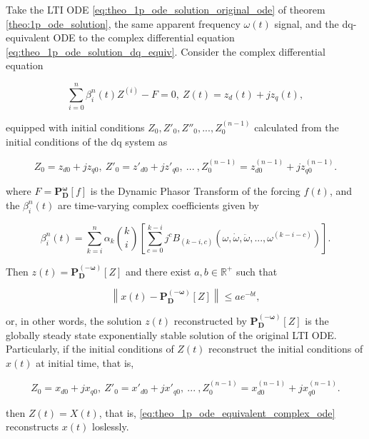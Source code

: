 \begin{theorem}\label{corollary:complex_equivalence_phasorialodes} %

	Take the LTI ODE \eqref{eq:theo_1p_ode_solution_original_ode} of theorem \ref{theo:1p_ode_solution}, the same apparent frequency $\omega(t)$ signal, and the dq-equivalent ODE to the complex differential equation \eqref{eq:theo_1p_ode_solution_dq_equiv}. Consider the complex differential equation

\begin{equation} \sum\limits_{i=0}^n \beta_i^n(t) Z^{(i)} - F = 0,\ Z(t) = z_d(t) + jz_q(t), \label{eq:theo_1p_ode_equivalent_complex_ode} \end{equation}

	\noindent equipped with	initial conditions $Z_0,Z'_0,Z''_0,...,Z^{(n-1)}_0$ calculated from the initial conditions of the dq system as

\begin{equation} Z_0 = z_{d0} + jz_{q0},\ Z'_0 = z'_{d0} + jz'_{q0},\ ...\ ,Z^{(n-1)}_0 = z^{(n-1)}_{d0} + jz^{(n-1)}_{q0}. \end{equation}
	
	\noindent where $F = \mathbf{P_D^\omega}\left[f\right]$ is the Dynamic Phasor Transform of the forcing $f(t)$, and the $\beta_i^n(t)$ are time-varying complex coefficients given by

\begin{equation} \beta_i^n(t) = \sum\limits_{k=i}^{n} \alpha_k{k\choose i} \left[\sum\limits_{c=0}^{k-i} j^cB_{\left(k-i,c\right)}\left(\omega,\dot{\omega},\ddot{\omega},...,\omega^{(k-i-c)}\right) \right].  \end{equation}

	\noindent Then $z(t) = \mathbf{P_D^{\left(-\omega\right)}}\left[Z\right]$ and there exist $a,b\in\mathbb{R}^+$ such that

\begin{equation} \left\lVert x(t) - \mathbf{P_D^{\left(-\omega\right)}}\left[Z\right] \right\rVert \leq ae^{-bt} ,\end{equation} 

	\noindent or, in other words, the solution $z(t)$ reconstructed by $\mathbf{P_D^{\left(-\omega\right)}}\left[Z\right]$ is the globally steady state exponentially stable solution of the original LTI ODE. Particularly, if the initial conditions of $Z(t)$ reconstruct the initial conditions of $x(t)$ at initial time, that is,

\begin{equation} Z_0 = x_{d0} + jx_{q0},\ Z'_0 = x'_{d0} + jx'_{q0},\ ...\ ,Z^{(n-1)}_0 = x^{(n-1)}_{d0} + jx^{(n-1)}_{q0}. \end{equation}

	\noindent then $Z(t) = X(t)$, that is, \eqref{eq:theo_1p_ode_equivalent_complex_ode} reconstructs $x(t)$ loslessly.
\end{theorem}
